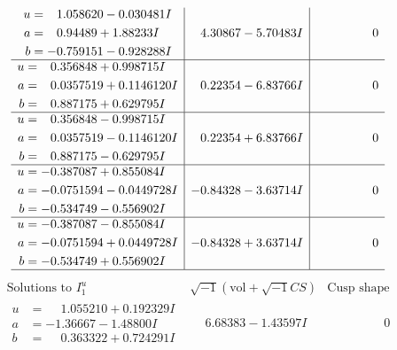\documentclass[1p]{elsarticle_modified}
\theoremstyle{definition}
\newcommand{\I}{\sqrt{-1}}
\begin{document}
$$\begin{array}{c|c|c}
\begin{aligned}
u &= \phantom{-}1.058620 - 0.030481 I \\
a &= \phantom{-}0.94489 + 1.88233 I \\
b &= -0.759151 - 0.928288 I\end{aligned}
 & \phantom{-}4.30867 - 5.70483 I & \phantom{-0.000000 } 0 \\ \hline\begin{aligned}
u &= \phantom{-}0.356848 + 0.998715 I \\
a &= \phantom{-}0.0357519 + 0.1146120 I \\
b &= \phantom{-}0.887175 + 0.629795 I\end{aligned}
 & \phantom{-}0.22354 - 6.83766 I & \phantom{-0.000000 } 0 \\ \hline\begin{aligned}
u &= \phantom{-}0.356848 - 0.998715 I \\
a &= \phantom{-}0.0357519 - 0.1146120 I \\
b &= \phantom{-}0.887175 - 0.629795 I\end{aligned}
 & \phantom{-}0.22354 + 6.83766 I & \phantom{-0.000000 } 0 \\ \hline\begin{aligned}
u &= -0.387087 + 0.855084 I \\
a &= -0.0751594 - 0.0449728 I \\
b &= -0.534749 - 0.556902 I\end{aligned}
 & -0.84328 - 3.63714 I & \phantom{-0.000000 } 0 \\ \hline\begin{aligned}
u &= -0.387087 - 0.855084 I \\
a &= -0.0751594 + 0.0449728 I \\
b &= -0.534749 + 0.556902 I\end{aligned}
 & -0.84328 + 3.63714 I & \phantom{-0.000000 } 0\\
 \hline 
 \end{array}$$\newpage$$\begin{array}{c|c|c}  
\text{Solutions to }I^u_{1}& \I (\text{vol} + \sqrt{-1}CS) & \text{Cusp shape}\\
 \hline 
\begin{aligned}
u &= \phantom{-}1.055210 + 0.192329 I \\
a &= -1.36667 - 1.48800 I \\
b &= \phantom{-}0.363322 + 0.724291 I\end{aligned}
 & \phantom{-}6.68383 - 1.43597 I & \phantom{-0.000000 } 0 \\ \hline\begin{aligned}

\end{aligned}
\end{array}$$
\end{document}
